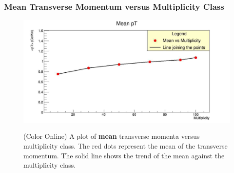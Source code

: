 \documentclass[letterpaper,aps,prc,superscriptaddress,nofootinbib,10pt,showpacs,floatfix]{revtex4-2}
\begin{document}
\subsubsection{Mean Transverse Momentum versus Multiplicity Class}
\label{subsubsec:mean}
\vspace{-5mm}
\begin{figure}[!htb]
	\begin{minipage}{1\textwidth}
   		\label{Fig:6}
     	\centering
     	\renewcommand{\thefigure}{6}
     	\includegraphics[width=\linewidth]{mean}
     	\begin{minipage}{0.8\textwidth}
     	\caption{(Color Online) A plot of \textbf{mean} transverse momenta versus multiplicity class. The red dots represent the mean of the transverse momentum. The solid line shows the trend of the mean against the multiplicity class.}
     	\end{minipage}
     \end{minipage}
\end{figure}

\FloatBarrier
\vspace{-3mm}
\end{document}
